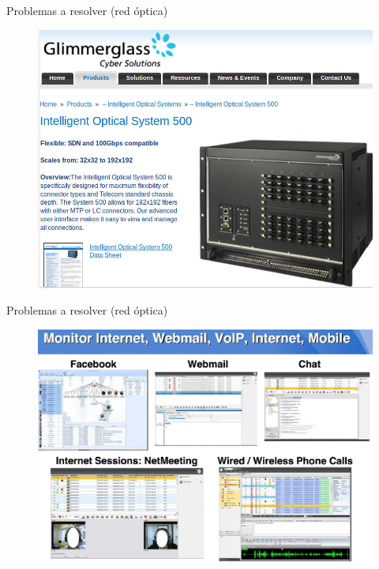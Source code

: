 \documentclass[aspectratio=169]{beamer}
\begin{document}


\begin{frame}{Problemas a resolver (red óptica)}
\begin{figure}[t]
  \centering
  \includegraphics[width=0.75 \textwidth]{graphs/glimmer1.jpg} 
\end{figure}
\end{frame}



\begin{frame}{Problemas a resolver (red óptica)}
\begin{figure}[t]
  \centering
  \includegraphics[width=0.75 \textwidth]{graphs/glimmer2.jpg} 
\end{figure}
\end{frame}

\end{document}
